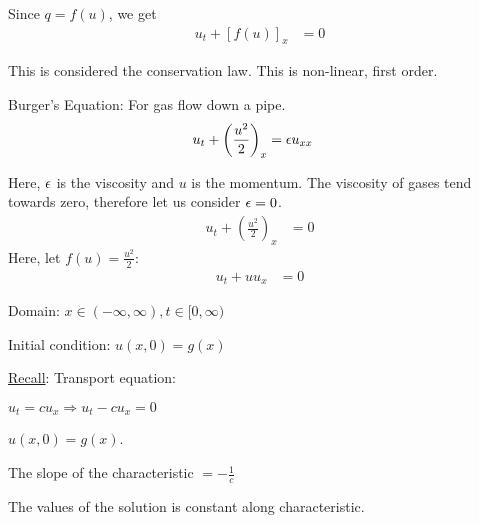 \documentclass{article}
\begin{document}
  Since $q = f(u)$, we get
  \begin{align}
    u_t + [f(u)]_x & = 0
  \end{align}

  This is considered the conservation law. This is non-linear, first order.

  \ex Burger's Equation: For gas flow down a pipe.
  \begin{align}
    u_t + \left( \frac{u^2}{2} \right)_x & = \epsilon u_{xx}
  \end{align}

  Here, $\epsilon$ is the viscosity and $u$ is the momentum. The viscosity of gases tend towards zero, therefore let us consider $\epsilon = 0$.
  \begin{align}
    u_t + \left( \frac{u^2}{2} \right)_x & = 0
  \end{align}
  Here, let $f(u) = \frac{u^2}{2}$:
  \begin{align}
    u_t + u u_x & = 0
  \end{align}

  Domain: $x \in (-\infty, \infty), t \in [0, \infty)$

  Initial condition: $u(x, 0) = g(x)$

  \underline{Recall}: Transport equation:

  $u_t = cu_x \Rightarrow u_t - cu_x = 0$

  $u(x, 0) = g(x)$.

  The slope of the characteristic $ = -\frac{1}{c}$

  The values of the solution is constant along characteristic.
\end{document}
